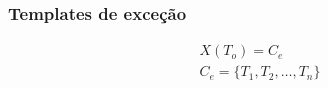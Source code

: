 \documentclass[aspectratio=43,hyperref={pdfpagelabels=false}]{beamer}
\begin{document}
 \begin{frame}
     \frametitle{Templates de exceção}

      \begin{equation}
      \begin{split}
      X(T_o)= C_e \\
      C_e = \{T_1,T_2,\dots, T_n\}\\
      \end{split}
      \end{equation}     
 \end{frame}
\end{document}

